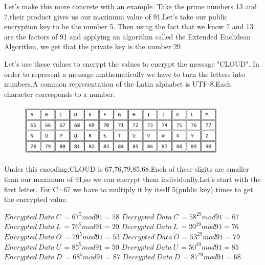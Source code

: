 \documentclass{article}
\begin{document}
Let's make this more concrete with an example. Take the prime numbers 13 and 7,their product gives us our maximum value of 91.Let's take our public encryption key to be the number 5. Then using the fact that we know 7 and 13 are the factors of 91 and applying an algorithm called the Extended Euclidean Algorithm, we get that the private key is the number 29 


\hspace{1cm}
\begin{centre}
\end{centre}

Let's use these values to encrypt the values to encrypt the message "CLOUD".
In order to represent a message mathematically we have to turn the letters into numbers.A common representation of the Latin alphabet is UTF-8.Each character corresponds to a  number.
\begin{figure}[h]
\includegraphics[width=10cm, height=2.5cm]{ASCII.png}
\centering
\end{figure}

Under this encoding,CLOUD is 67,76,79,85,68.Each of these digits are smaller than our maximum of 91,so we can encrypt them individually.Let's start with the first letter.
For C=67 we have to multiply it by itself 5(public key) times to get the encrypted value.

\begin{centre}
\hspace{0.8cm}
\end{centre}


\(Encrypted\:Data\:C\,=67^5mod91=58\) \hspace{0.6cm} \(Decrypted\:Data \:C\,=58^{29}mod91=67\)\\
\(Encrypted\: Data\: L\,=76^5mod91=20\) \hspace{0.6cm} \(Decrypted\:Data \:L\,=20^{29}mod91=76\)\\
\(Encrypted\: Data \:O\,=79^5mod91=53\) \hspace{0.6cm} \(Decrypted\:Data \:O\,=53^{29}mod91=79\)\\
\(Encrypted\: Data\: U\,=85^5mod91=50\) \hspace{0.6cm}\(Decrypted\:Data \:U\,=50^{29}mod91=85\)\\
\(Encrypted \:Data\: D\,=68^5mod91=87\) \hspace{0.6cm} \(Decrypted\:Data \:D\,=87^{29}mod91=68\)\\
\end{document}
